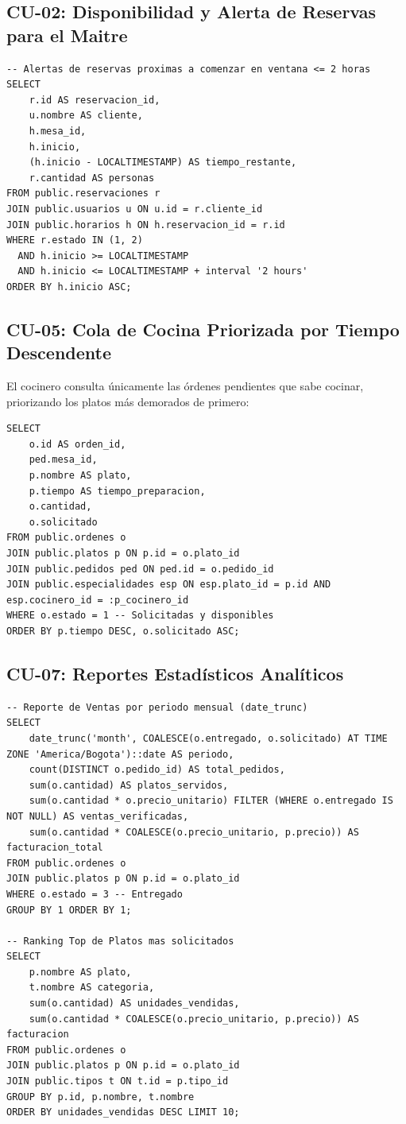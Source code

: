 \documentclass[11pt,letterpaper]{article}
\begin{document}
\subsection{CU-02: Disponibilidad y Alerta de Reservas para el Maitre}
\begin{lstlisting}[style=sqlstyle]
-- Alertas de reservas proximas a comenzar en ventana <= 2 horas
SELECT
    r.id AS reservacion_id,
    u.nombre AS cliente,
    h.mesa_id,
    h.inicio,
    (h.inicio - LOCALTIMESTAMP) AS tiempo_restante,
    r.cantidad AS personas
FROM public.reservaciones r
JOIN public.usuarios u ON u.id = r.cliente_id
JOIN public.horarios h ON h.reservacion_id = r.id
WHERE r.estado IN (1, 2)
  AND h.inicio >= LOCALTIMESTAMP
  AND h.inicio <= LOCALTIMESTAMP + interval '2 hours'
ORDER BY h.inicio ASC;
\end{lstlisting}

\subsection{CU-05: Cola de Cocina Priorizada por Tiempo Descendente}
El cocinero consulta únicamente las órdenes pendientes que sabe cocinar, priorizando los platos más demorados de primero:
\begin{lstlisting}[style=sqlstyle]
SELECT
    o.id AS orden_id,
    ped.mesa_id,
    p.nombre AS plato,
    p.tiempo AS tiempo_preparacion,
    o.cantidad,
    o.solicitado
FROM public.ordenes o
JOIN public.platos p ON p.id = o.plato_id
JOIN public.pedidos ped ON ped.id = o.pedido_id
JOIN public.especialidades esp ON esp.plato_id = p.id AND esp.cocinero_id = :p_cocinero_id
WHERE o.estado = 1 -- Solicitadas y disponibles
ORDER BY p.tiempo DESC, o.solicitado ASC;
\end{lstlisting}

\subsection{CU-07: Reportes Estadísticos Analíticos}
\begin{lstlisting}[style=sqlstyle]
-- Reporte de Ventas por periodo mensual (date_trunc)
SELECT
    date_trunc('month', COALESCE(o.entregado, o.solicitado) AT TIME ZONE 'America/Bogota')::date AS periodo,
    count(DISTINCT o.pedido_id) AS total_pedidos,
    sum(o.cantidad) AS platos_servidos,
    sum(o.cantidad * o.precio_unitario) FILTER (WHERE o.entregado IS NOT NULL) AS ventas_verificadas,
    sum(o.cantidad * COALESCE(o.precio_unitario, p.precio)) AS facturacion_total
FROM public.ordenes o
JOIN public.platos p ON p.id = o.plato_id
WHERE o.estado = 3 -- Entregado
GROUP BY 1 ORDER BY 1;

-- Ranking Top de Platos mas solicitados
SELECT
    p.nombre AS plato,
    t.nombre AS categoria,
    sum(o.cantidad) AS unidades_vendidas,
    sum(o.cantidad * COALESCE(o.precio_unitario, p.precio)) AS facturacion
FROM public.ordenes o
JOIN public.platos p ON p.id = o.plato_id
JOIN public.tipos t ON t.id = p.tipo_id
GROUP BY p.id, p.nombre, t.nombre
ORDER BY unidades_vendidas DESC LIMIT 10;
\end{lstlisting}
\end{document}

